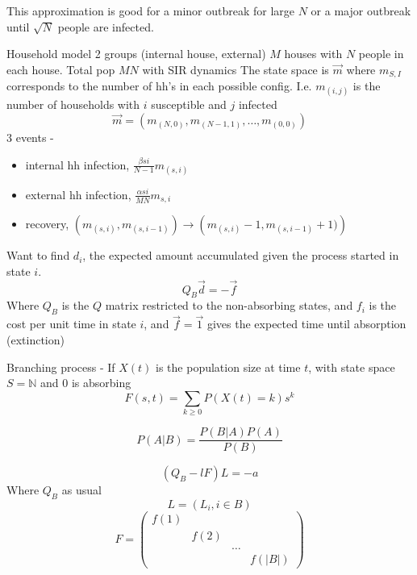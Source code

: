 \documentclass{X:/Documents/Coding/Latex/myassignment}
\begin{document}
This approximation is good for a minor outbreak for large $N$ or a major outbreak until $\sqrt{N}$ people are infected.


Household model 2 groups (internal house, external) $M$ houses with $N$ people in each house. Total pop $MN$ with SIR dynamics
The state space is $\vec m$ where $m_{S,I}$ corresponds to the number of hh's in each possible config. I.e. $m_{(i,j)}$ is the number of households with $i$ susceptible and $j$ infected
\[\vec m = \left(m_{(N,0)}, m_{(N-1,1)},\ldots, m_{(0,0)}\right)\]
3 events -
\begin{itemize}
	\item internal hh infection, $ \frac{\beta si}{N-1} m_{(s,i)} $
	\item external hh infection, $ \frac{\alpha si}{MN} m_{s,i}$
	\item recovery, $\left(m_{(s,i)}, m_{(s,i-1)} \right) \to \left(m_{(s,i)}-1,m_{(s,i-1)}+1)\right)$
\end{itemize}


Want to find $d_i$, the expected amount accumulated given the process started in state $i$. 
\[Q_B \vec d = - \vec f\]
Where $Q_B$ is the $Q$ matrix restricted to the non-absorbing states, and $f_i$ is the cost per unit time in state $i$, and $\vec f = \vec 1$ gives the expected time until absorption (extinction)


Branching process - 
If $X(t)$ is the population size at time $t$, with state space $S=\mathbb{N}$ and $0$ is absorbing
\[F(s,t) = \sum_{k\geq 0} P(X(t)=k)s^k\]




\[P(A|B) = \frac{P(B|A) P(A)}{P(B)}\]







\[(Q_B - lF)L = -a\]
Where $Q_B$ as usual
\[L = (L_i, i\in B)\]
\[F = \begin{pmatrix}
	f(1)\\
	&f(2)\\
	&&\ldots\\
	&&&f(|B|)
\end{pmatrix}\]
\end{document}
